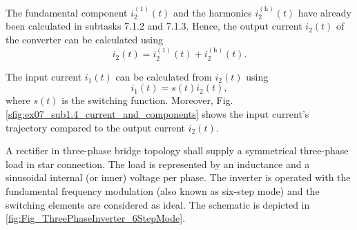 
\newpage
\begin{solutionblock}
The fundamental component $i^\mathrm{(1)}_\mathrm{2}(t)$ and the harmonics $i^{(\mathrm{h})}_\mathrm{2}(t)$ have already been calculated in subtasks 7.1.2 and 7.1.3. Hence,
the output current $i_\mathrm{2}(t)$ of the converter can be calculated using 
\begin{equation}
    i_\mathrm{2}(t) = i^\mathrm{(1)}_\mathrm{2}(t) + i^{(\mathrm{h})}_\mathrm{2}(t).
    \label{7.1.2:eq:approx_i_2}         
\end{equation}
\end{solutionblock} 


\begin{solutionblock}
    The input current $i_\mathrm{1}(t)$ can be calculated from $i_\mathrm{2}(t)$ using 
    \begin{equation}
        i_\mathrm{1}(t) = s(t) i_\mathrm{2}(t),
        \label{7.1.2:eq:input_current_i_1}         
    \end{equation}
    where $s(t)$ is the switching function. Moreover, Fig. \ref{sfig:ex07_sub1.4_current_and_components} shows the input current's trajectory
    compared to the output current $i_\mathrm{2}(t)$.
    \end{solutionblock}








\newpage


A rectifier in three-phase bridge topology shall supply a
symmetrical three-phase load in star connection. The load is represented by an inductance and 
a sinusoidal internal (or inner) voltage per phase. The inverter is operated with the fundamental 
frequency modulation (also known as six-step mode) and the switching elements are considered as ideal. 
The schematic is depicted in \autoref{fig:Fig_ThreePhaseInverter_6StepMode}.

